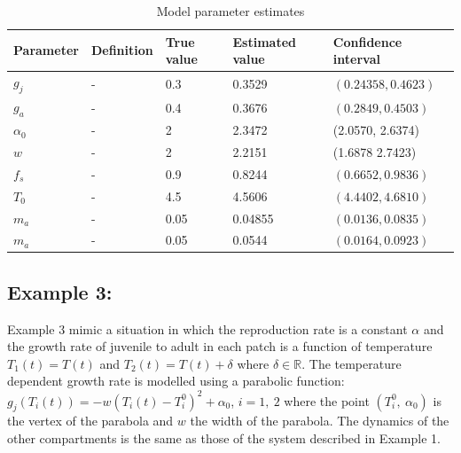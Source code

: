\documentclass[12pt, table]{article}
\begin{document}
\begin{table}[H]
\small
\begin{center}
\begin{tabular}{lllll}
  \hline
  Parameter&Definition&True value&Estimated value& Confidence interval\\
  \hline
  $g_j$&-&0.3&0.3529&$( 0.24358, 0.4623)$\\
  $g_a$&-&0.4&0.3676&$(0.2849, 0.4503)$\\
  $\alpha_0$&-&2&2.3472&(2.0570,  2.6374)\\
  $w$&-&2&2.2151&(1.6878 2.7423)\\
  $f_s$&-&0.9&0.8244&$(0.6652, 0.9836)$\\
  $T_0$&-&4.5&4.5606&$(4.4402, 4.6810)$\\
  $m_a$&-&0.05&0.04855&$(0.0136, 0.0835)$\\
  $m_a$&-&0.05&0.0544&$(0.0164, 0.0923)$\\
  \hline
\end{tabular}
\end{center}
\caption{Model parameter estimates}
\label{table1}
\end{table}


\subsection{Example 3:}
Example 3 mimic a situation in which the reproduction rate is a constant $\alpha$ and the growth rate of juvenile to adult in each patch is a function of temperature $T_1(t)=T(t)$ and $T_2(t)=T(t)+\delta$ where $\delta \in \mathbb{R}$. The  temperature dependent growth rate is modelled using a parabolic function: $g_j(T_i(t))=-w(T_i(t)-T_i^0)^2+\alpha_0$, $i=1,~2$ where the point $(T_i^0,~\alpha_0)$  is the vertex of the parabola and $w$ the width of the parabola.  The dynamics of the other compartments is  the same as those of the system  described in Example 1. 
\end{document}

